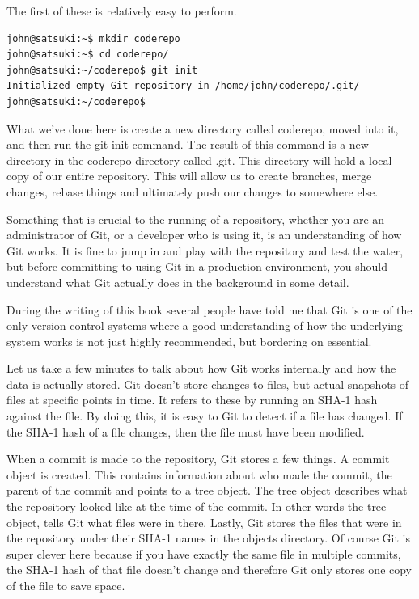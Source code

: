 The first of these is relatively easy to perform.  

\begin{Verbatim}[frame=leftline,framerule=1mm,fontsize=\relsize{-3}]
john@satsuki:~$ mkdir coderepo
john@satsuki:~$ cd coderepo/
john@satsuki:~/coderepo$ git init
Initialized empty Git repository in /home/john/coderepo/.git/
john@satsuki:~/coderepo$
\end{Verbatim}

What we've done here is create a new directory called coderepo, moved into it, and then run the git init command.  The result of this command is a new directory in the coderepo directory called .git.  This directory will hold a local copy of our entire repository.  This will allow us to create branches, merge changes, rebase things and ultimately push our changes to somewhere else.

Something that is crucial to the running of a repository, whether you are an administrator of Git, or a developer who is using it, is an understanding of how Git works.  It is fine to jump in and play with the repository and test the water, but before committing to using Git in a production environment, you should understand what Git actually does in the background in some detail. 

During the writing of this book several people have told me that Git is one of the only version control systems where a good understanding of how the underlying system works is not just highly recommended, but bordering on essential. 

Let us take a few minutes to talk about how Git works internally and how the data is actually stored.  Git doesn't store changes to files, but actual snapshots of files at specific points in time.  It refers to these by running an SHA-1 hash against the file.  By doing this, it is easy to Git to detect if a file has changed.  If the SHA-1 hash of a file changes, then the file must have been modified. 

When a commit is made to the repository, Git stores a few things.  A commit object is created.  This contains information about who made the commit, the parent of the commit and points to a tree object.  The tree object describes what the repository looked like at the time of the commit.  In other words the tree object, tells Git what files were in there.  Lastly, Git stores the files that were in the repository under their SHA-1 names in the objects directory.  Of course Git is super clever here because if you have exactly the same file in multiple commits, the SHA-1 hash of that file doesn't change and therefore Git only stores one copy of the file to save space.

